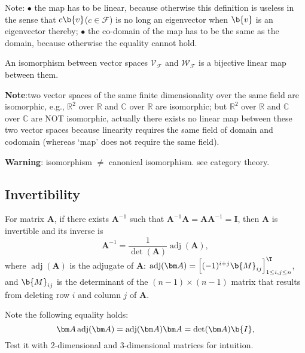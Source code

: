 Note: $\bullet$ the map has to be linear, because otherwise this definition is useless in the sense that $c\b{v}$($c \in \mathcal{F}$) is no long an eigenvector when $\b{v}$ is an eigenvector thereby; $\bullet$ the co-domain of the map has to be the same as the domain, because otherwise the equality cannot hold.

\begin{definition} 
An isomorphism between vector spaces $\mathcal{V}_{\mathcal{F}}$ and $\mathcal{W}_{\mathcal{F}}$ is a bijective linear map between them.
\end{definition}

\textbf{Note}:two vector spaces of the same finite dimensionality over the same field are isomorphic, e.g., $\mathbb{R}^2$ over $\mathbb{R}$ and $\mathbb{C}$ over $\mathbb{R}$ are isomorphic; but $\mathbb{R}^2$ over $\mathbb{R}$ and $\mathbb{C}$ over $\mathbb{C}$ are NOT isomorphic, actually there exists no linear map between these two vector spaces because linearity requires the same field of domain and codomain (whereas `map' does not require the same field).

\textbf{Warning}: isomorphism $\neq$ canonical isomorphism. see category theory.


\subsection{Invertibility}

\begin{definition}
For matrix $\bm A$, if there exists $\bm A^{-1}$ such that $\bm A^{-1} \bm A = \bm A \bm A^{-1} = \bm I$, then $\bm A$ is invertible and its inverse is
%
\begin{equation*}
    \bm A^{-1}  =  \frac{1}{\det(\bm A)} \operatorname {adj}(\bm A),
\end{equation*}
%
where $\operatorname {adj}(\bm A)$ is the adjugate of $\bm A$: 
$\operatorname {adj}(\bm A) = \left[ (-1)^{i+j} \b{M}_{ij} \right]_{1\leq i,j\leq n}^\T$,
and $\b{M}_{ij}$ is the determinant of the $(n-1) \times (n-1)$ matrix that results from deleting row $i$ and column $j$ of $\bm A$.
\end{definition}

\begin{remark}
Note the following equality holds:
%
\begin{equation*}
    \bm A \operatorname {adj}(\bm A) =   \operatorname {adj}(\bm A) \bm A = \det(\bm A) \b{I},
\end{equation*}
%
Test it with 2-dimensional and 3-dimensional matrices for intuition.
\end{remark}



